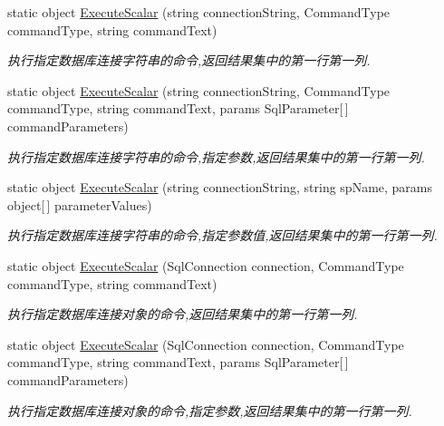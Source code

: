 \begin{DoxyCompactItemize}
static object \hyperlink{class_x_c_l_net_tools_1_1_data_base_1_1_m_s_s_q_l_1_1_sql_helper_aafc07aaf3567b5a7b438d6df330edb9e}{Execute\+Scalar} (string connection\+String, Command\+Type command\+Type, string command\+Text)
\begin{DoxyCompactList}\small\item\em 执行指定数据库连接字符串的命令,返回结果集中的第一行第一列. \end{DoxyCompactList}\item 
static object \hyperlink{class_x_c_l_net_tools_1_1_data_base_1_1_m_s_s_q_l_1_1_sql_helper_abad3af8ca3ebffe104c01485eb220bbc}{Execute\+Scalar} (string connection\+String, Command\+Type command\+Type, string command\+Text, params Sql\+Parameter\mbox{[}$\,$\mbox{]} command\+Parameters)
\begin{DoxyCompactList}\small\item\em 执行指定数据库连接字符串的命令,指定参数,返回结果集中的第一行第一列. \end{DoxyCompactList}\item 
static object \hyperlink{class_x_c_l_net_tools_1_1_data_base_1_1_m_s_s_q_l_1_1_sql_helper_adce1e673c1866939633656ba3de9dd9a}{Execute\+Scalar} (string connection\+String, string sp\+Name, params object\mbox{[}$\,$\mbox{]} parameter\+Values)
\begin{DoxyCompactList}\small\item\em 执行指定数据库连接字符串的命令,指定参数值,返回结果集中的第一行第一列. \end{DoxyCompactList}\item 
static object \hyperlink{class_x_c_l_net_tools_1_1_data_base_1_1_m_s_s_q_l_1_1_sql_helper_aa8413d019d1b830ba7c3028da1e506e1}{Execute\+Scalar} (Sql\+Connection connection, Command\+Type command\+Type, string command\+Text)
\begin{DoxyCompactList}\small\item\em 执行指定数据库连接对象的命令,返回结果集中的第一行第一列. \end{DoxyCompactList}\item 
static object \hyperlink{class_x_c_l_net_tools_1_1_data_base_1_1_m_s_s_q_l_1_1_sql_helper_a6841f23db7428756872e80eb545c0d3e}{Execute\+Scalar} (Sql\+Connection connection, Command\+Type command\+Type, string command\+Text, params Sql\+Parameter\mbox{[}$\,$\mbox{]} command\+Parameters)
\begin{DoxyCompactList}\small\item\em 执行指定数据库连接对象的命令,指定参数,返回结果集中的第一行第一列. \end{DoxyCompactList}\item 

\end{DoxyCompactItemize}
